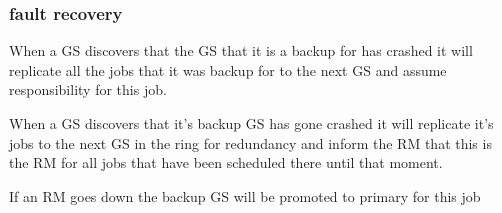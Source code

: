 \subsubsection{fault recovery}
When a GS discovers that the GS that it is a backup for has crashed it will replicate all the jobs that it was backup for to the next GS and assume responsibility for this job.

When a GS discovers that it's backup GS has gone crashed it will replicate it's jobs to the next GS in the ring for redundancy and inform the RM that this is the RM for all jobs that have been scheduled there until that moment. 

If an RM goes down the backup GS will be promoted to primary for this job

